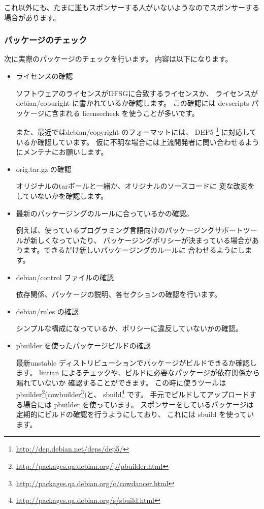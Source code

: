 \documentclass[mingoth,a4paper]{jsarticle}
\begin{document}
これ以外にも、たまに誰もスポンサーする人がいないようなのでスポンサーする場合があります。

\subsubsection{パッケージのチェック}

次に実際のパッケージのチェックを行います。
内容は以下になります。

\begin{itemize}

\item ライセンスの確認

ソフトウェアのライセンスがDFSGに合致するライセンスか、
ライセンスが debian/copuright に書かれているか確認します。
この確認には devscripts パッケージに含まれる licensecheck を使うことが多いです。

また、最近ではdebian/copyright のフォーマットには、
DEP5
\footnote{\url{http://dep.debian.net/deps/dep5/}}
に対応しているか確認しています。
仮に不明な場合には上流開発者に問い合わせるようにメンテナにお願いします。

\item orig.tar.gz の確認

オリジナルのtarボールと一緒か、オリジナルのソースコードに
変な改変をしていないかを確認します。

\item 最新のパッケージングのルールに合っているかの確認。

例えば、使っているプログラミング言語向けのパッケージングサポートツールが新しくなっていたり、
パッケージングポリシーが決まっている場合があります。できるだけ新しいパッケージングのルールに
合わせるようにします。

\item debian/control ファイルの確認

依存関係、パッケージの説明、各セクションの確認を行います。

\item debian/rules の確認

シンプルな構成になっているか、ポリシーに違反していないかの確認。

\item pbuilder を使ったパッケージビルドの確認

最新unstable ディストリビューションでパッケージがビルドできるか確認します。
lintian によるチェックや、ビルドに必要なパッケージが依存関係から漏れていないか
確認することができます。
この時に使うツールは pbuilder\footnote{\url{http://packages.qa.debian.org/p/pbuilder.html}}(cowbuilder\footnote{\url{http://packages.qa.debian.org/c/cowdancer.html}})と、
sbuild\footnote{\url{http://packages.qa.debian.org/s/sbuild.html}} です。
手元でビルドしてアップロードする場合には pbuilder を使っています。
スポンサーをしているパッケージは定期的にビルドの確認を行うようにしており、
これには sbuild を使っています。


\end{itemize}
\end{document}
